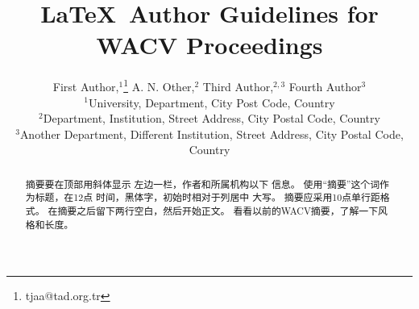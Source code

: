 \documentclass[10pt,letterpaper,a4paper]{article}
\title{\LaTeX\ Author Guidelines for WACV Proceedings}
\begin{document}
\frontmatter
\maketitle
\newcommand{\orcid}[1]{\href{https://orcid.org/#1}{\textcolor[HTML]{blue}{\aiOrcid}}}

\author[F. Author et al.]{%
First Author,$^{1}$\thanks{tjaa@tad.org.tr}\orcid{0000-0000-0000-0000}
A. N. Other,$^{2}$\orcid{0000-0000-0000-0000}
Third Author,$^{2,3}$\orcid{0000-0000-0000-0000}
\newauthor
Fourth Author$^{3}$\orcid{0000-0000-0000-0000}
\\
$^{1}$University, Department, City Post Code, Country\\
$^{2}$Department, Institution, Street Address, City Postal Code, Country\\
$^{3}$Another Department, Different Institution, Street Address, City Postal Code, Country%
\vspace*{12pt}}

\begin{abstract}
   摘要要在顶部用斜体显示  
   左边一栏，作者和所属机构以下  
   信息。 使用“摘要”这个词作为标题，在12点  
   时间，黑体字，初始时相对于列居中  
   大写。 摘要应采用10点单行距格式。  
   在摘要之后留下两行空白，然后开始正文。  
   看看以前的WACV摘要，了解一下风格和长度。  
\end{abstract}


\newpage\tableofcontents  %

\twocolumn %
\end{document}

